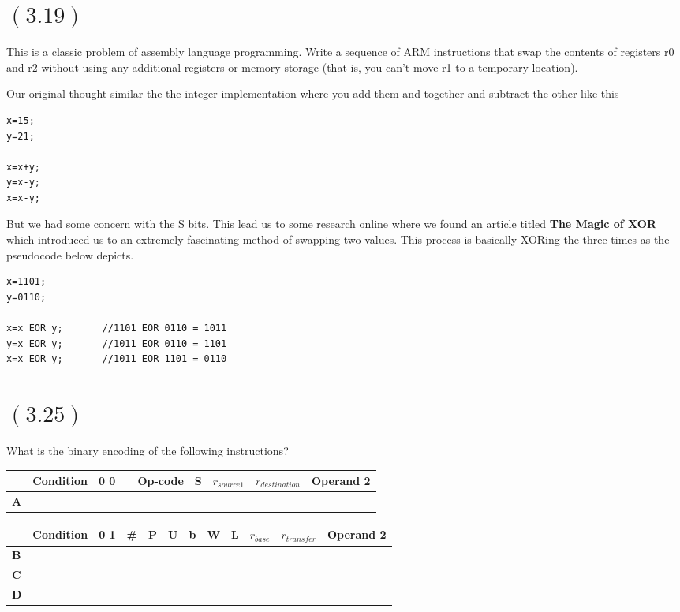 \documentclass[letterpaper,12pt,titlepage]{article}
\begin{document}
\newpage

\section*{$(3.19)$} This is a classic problem of assembly language programming. Write a sequence of ARM instructions that swap the contents of registers r0 and r2 without using any additional registers or memory storage (that is, you can't move r1 to a temporary location).
\begin{mdframed}[style=MyFrame]
Our original thought similar the the integer implementation where you add them and together and subtract the other like this
\begin{verbatim}
x=15;
y=21;

x=x+y;
y=x-y;
x=x-y;
\end{verbatim}
But we had some concern with the S bits. This lead us to some research online where we found an article titled \textbf{The Magic of XOR} \cite{Charles} which introduced us to an extremely fascinating method of swapping two values. This process is basically XORing the three times as the pseudocode below depicts.
\begin{verbatim}
x=1101;
y=0110;

x=x EOR y;       //1101 EOR 0110 = 1011
y=x EOR y;       //1011 EOR 0110 = 1101
x=x EOR y;       //1011 EOR 1101 = 0110
\end{verbatim}
\vspace{-0.5cm}
\end{mdframed}

\newpage
\section*{$(3.25)$} What is the binary encoding of the following instructions?
\begin{center}
\begin{tabular}{| l | l | l | l | l | l | l | l | l | }
\hline 
& Condition & 0 0 & & Op-code & S & $r_{source1}$ & $r_{destination}$ & Operand 2 \\
\hline 
\textbf{A}& & & & & & &  &  \\ 
\hline 
\end{tabular}


\begin{tabular}{| l | l | l | l | l | l | l | l | l | l | l | l | }
\hline 
& Condition & 0 1 & \# & P & U & b &W & L & $r_{base}$ & $r_{transfer}$ & Operand 2 \\
\hline
\textbf{B}& & & & & & &  &  &  &  & \\
\hline
\textbf{C}& & & & & & &  &  &   & &\\
\hline
\textbf{D}& & & & & &  &  &  &  &  &\\
\hline
\end{tabular}
\end{center}
 
\end{document}
